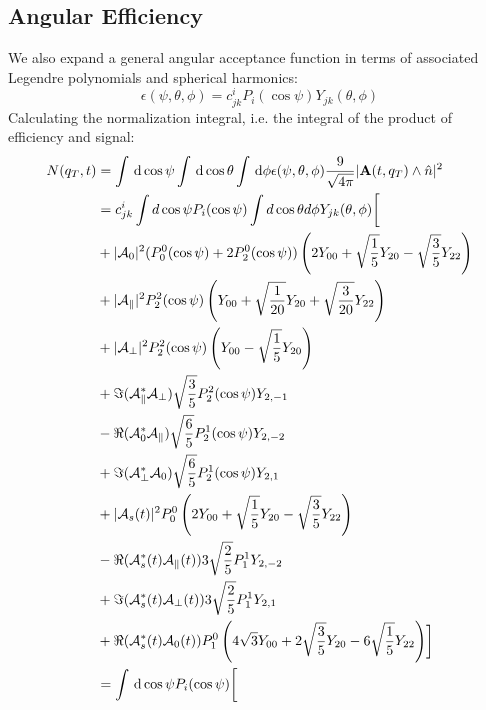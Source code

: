 \subsection{Angular Efficiency} \label{sec:angEff}
We also expand a general angular acceptance function in terms of associated Legendre polynomials
and spherical harmonics:
\begin{equation}
   \epsilon(\psi,\theta,\phi) = c^{i}_{jk} P_i(\cos\psi)Y_{jk}(\theta,\phi)
   \label{eq:eps_exp}
\end{equation}
Calculating the normalization integral, i.e. the integral of the product of efficiency and signal:
\begin{align}
  N(q_T,t)  &=  \int \ud\cos\psi\int \ud\cos\theta \int \ud\phi \epsilon(\psi,\theta,\phi)
      \frac{9}{\sqrt{4\pi}}|{\bf A}(t,q_T) \wedge \hat{n}|^2 \\
  &= c^i_{jk} \int d\cos\psi   P_i(\cos\psi)  \int d\cos\theta d\phi Y_{jk}(\theta,\phi)
    \biggl[\\
    & + |{\cal A}_0|^2  (P_0^0(\cos\psi)+2P_2^0(\cos\psi))
      \left( 2Y_{00}+\sqrt{\frac{1}{5}}Y_{20} - \sqrt{\frac{3}{5}}Y_{22} \right) \\
    & + |{\cal A}_\parallel|^2 P_2^2(\cos\psi)
      \left( Y_{00} + \sqrt{\frac{1}{20}}Y_{20} + \sqrt{\frac{3}{20}}Y_{22} \right) \\
    & + |{\cal A}_\perp|^2  P_2^2(\cos\psi) \left( Y_{00} - \sqrt{\frac{1}{5}}Y_{20}\right)\\
    & + \Im({\cal A}_\parallel^*{\cal A}_\perp) \sqrt{\frac{3}{5}}P_2^2(\cos\psi) Y_{2,-1} \\
    & - \Re({\cal A}_0^*{\cal A}_\parallel) \sqrt{\frac{6}{5}}P_2^1(\cos\psi) Y_{2,-2} \\
    & + \Im({\cal A}_\perp^* {\cal A}_0) \sqrt{\frac{6}{5}}P_2^1(\cos\psi)Y_{2,1} \\
    & + |{\cal A}_{s}(t)|^2  P_0^0
      \left( 2Y_{00} + \sqrt{\frac{1}{5}}Y_{20} - \sqrt{\frac{3}{5}} Y_{22} \right) \\
    & - \Re({\cal A}_{s}^*(t){\cal A}_\parallel(t)) 3\sqrt{\frac{2}{5}} P_1^1 Y_{2,-2} \\
    & + \Im({\cal A}_{s}^*(t){\cal A}_\perp(t)) 3\sqrt{\frac{2}{5}} P_1^1 Y_{2,1}\\
    & + \Re({\cal A}_{s}^*(t){\cal A}_0(t)) P_1^0
      \left( 4\sqrt{3}  Y_{00} + 2 \sqrt{\frac{3}{5}} Y_{20} - 6 \sqrt{\frac{1}{5}}Y_{22} \right)
    \biggr] \\
      &= \int \ud\cos\psi   P_i(\cos\psi) \biggl[ \\

\end{align}
